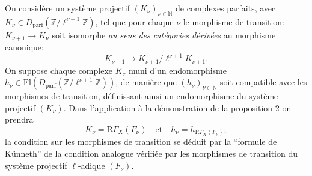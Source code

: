 On considère un système projectif $(K_\nu)_{\nu\in\mathbb{N}}$ de complexes parfaits, avec $K_\nu\in D_{\mathrm{parf}}(\mathbb{Z}/\ell^{\nu+1}\mathbb{Z})$, tel que pour chaque $\nu$ le
morphisme de transition: $K_{\nu+1}\to K_\nu$ soit isomorphe \emph{au sens des catégories dérivées} au morphisme canonique:
\[
K_{\nu+1}\to K_{\nu+1}/\ell^{\nu+1}K_{\nu+1}.
\]
On suppose chaque complexe $K_\nu$ muni d'un endomorphisme $h_\nu\in\mathrm{Fl}(D_{\mathrm{parf}}(\mathbb{Z}/\ell^{\nu+1}\mathbb{Z}))$, de manière que $(h_\nu)_{\nu\in\mathbb{N}}$ soit compatible avec les morphismes de transition, définissant ainsi un endomorphisme du système projectif $(K_\nu)$. Dans l'application à la démonstration de la proposition 2 on prendra
\[
K_\nu=\mathrm{R}\Gamma_X(F_\nu)\quad\text{et}\quad h_\nu=h_{\mathrm{R}\Gamma_X(F_\nu)};
\]
la condition sur les morphismes de transition se déduit par la ``formule de Künneth'' de la condition analogue vérifiée par les morphismes de transition du système projectif $\ell$-adique $(F_\nu)$.

